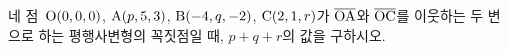 네 점~$\mathrm{O}(0{,}\mkern3mu\mathopen{}0{,}\mkern3mu\mathopen{}0)$, $\mathrm{A}(p{,}\mkern3mu\mathopen{}5{,}\mkern3mu\mathopen{}3)$, $\mathrm{B}(-4{,}\mkern3mu\mathopen{}q{,}\mkern3mu\mathopen{}-2)$, $\mathrm{C}(2{,}\mkern3mu\mathopen{}1{,}\mkern3mu\mathopen{}r)$가 $\overline{\mathrm{OA}}$와 $\overline{\mathrm{OC}}$를 이웃하는 두 변으로 하는 평행사변형의 꼭짓점일 때, $p+q+r$의 값을 구하시오.
